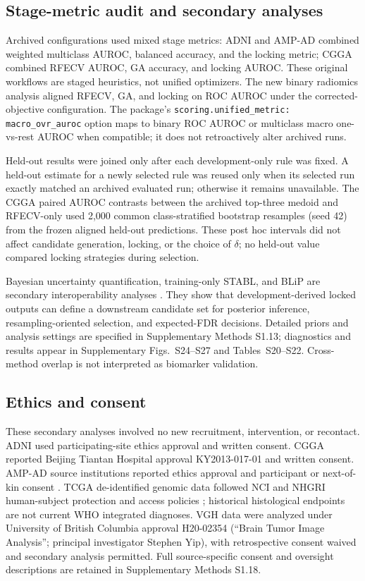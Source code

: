 \subsection{Stage-metric audit and secondary analyses}

Archived configurations used mixed stage metrics: ADNI and AMP-AD combined weighted multiclass AUROC, balanced accuracy, and the locking metric; CGGA combined RFECV AUROC, GA accuracy, and locking AUROC. These original workflows are staged heuristics, not unified optimizers. The new binary radiomics analysis aligned RFECV, GA, and locking on ROC AUROC under the corrected-objective configuration. The package's \texttt{scoring.unified\_metric: macro\_ovr\_auroc} option maps to binary ROC AUROC or multiclass macro one-vs-rest AUROC when compatible; it does not retroactively alter archived runs.

Held-out results were joined only after each development-only rule was fixed. A held-out estimate for a newly selected rule was reused only when its selected run exactly matched an archived evaluated run; otherwise it remains unavailable. The CGGA paired AUROC contrasts between the archived top-three medoid and RFECV-only used 2,000 common class-stratified bootstrap resamples (seed 42) from the frozen aligned held-out predictions. These post hoc intervals did not affect candidate generation, locking, or the choice of \(\delta\); no held-out value compared locking strategies during selection.

Bayesian uncertainty quantification, training-only STABL, and BLiP are secondary interoperability analyses \citep{ref25,ref30,ref32,ref33,ref34}. They show that development-derived locked outputs can define a downstream candidate set for posterior inference, resampling-oriented selection, and expected-FDR decisions. Detailed priors and analysis settings are specified in Supplementary Methods S1.13; diagnostics and results appear in Supplementary Figs.~S24--S27 and Tables~S20--S22. Cross-method overlap is not interpreted as biomarker validation.

\subsection{Ethics and consent}

These secondary analyses involved no new recruitment, intervention, or recontact. ADNI used participating-site ethics approval and written consent. CGGA reported Beijing Tiantan Hospital approval KY2013-017-01 and written consent. AMP-AD source institutions reported ethics approval and participant or next-of-kin consent \citep{ref37}. TCGA de-identified genomic data followed NCI and NHGRI human-subject protection and access policies \citep{ref44,ref45}; historical histological endpoints are not current WHO integrated diagnoses. VGH data were analyzed under University of British Columbia approval H20-02354 (``Brain Tumor Image Analysis''; principal investigator Stephen Yip), with retrospective consent waived and secondary analysis permitted. Full source-specific consent and oversight descriptions are retained in Supplementary Methods S1.18.

